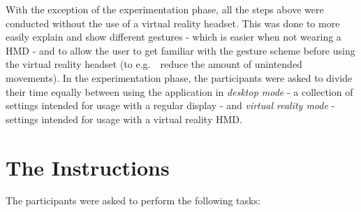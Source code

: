 With the exception of the experimentation phase, all the steps above were conducted without the use of a virtual reality headset. 
This was done to more easily explain and show different gestures - which is easier when not wearing a HMD - and to allow the user to 
get familiar with the gesture scheme before using the virtual reality headset (to e.g.~~reduce the amount of unintended movements).
In the experimentation phase, the participants were asked to divide their time equally between using the application in \textit{desktop mode} 
- a collection of settings intended for usage with a regular display - and \textit{virtual reality mode} - settings intended for usage with a virtual reality HMD. 

\section{The Instructions}
The participants were asked to perform the following tasks:

